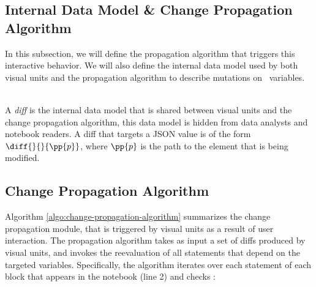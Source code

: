 \subsection{Internal Data Model \& Change Propagation Algorithm}
\label{section:change-propagation-datamodel}

In this subsection, we will define the propagation algorithm that triggers this interactive behavior. We will also define the internal data model used by both visual units and the propagation algorithm to describe mutations on \projname\ variables.

 \\A \emph{diff} is the internal data model that is shared between visual units and the change propagation algorithm, this data model is hidden from data analysts and notebook readers. A diff that targets a JSON value is of the form $\diff{}{}{\pp{p}}$, where $\pp{p}$ is the path to the element that is being modified. 

\subsection{Change Propagation Algorithm}
\label{section:change-propagation-algorithm}

Algorithm \ref{algo:change-propagation-algorithm} summarizes the change propagation module, that is triggered by visual units as a result of user interaction. The propagation algorithm takes as input a set of diffs produced by visual units, and invokes the reevaluation of all statements that depend on the targeted variables. Specifically, the algorithm iterates over each statement of each block that appears in the notebook (line 2) and checks :

